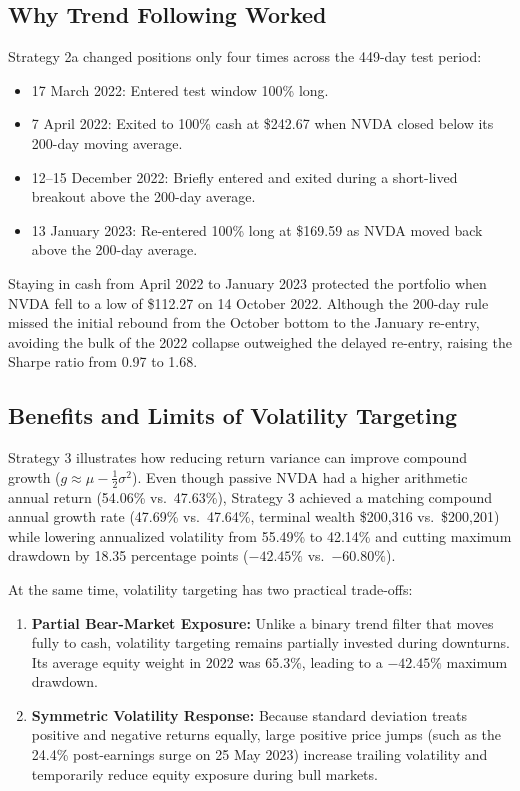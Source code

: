 \documentclass[11pt, a4paper]{article}
\begin{document}
\subsection{Why Trend Following Worked}
Strategy 2a changed positions only four times across the 449-day test period:
\begin{itemize}
    \item 17 March 2022: Entered test window 100\% long.
    \item 7 April 2022: Exited to 100\% cash at \$242.67 when NVDA closed below its 200-day moving average.
    \item 12--15 December 2022: Briefly entered and exited during a short-lived breakout above the 200-day average.
    \item 13 January 2023: Re-entered 100\% long at \$169.59 as NVDA moved back above the 200-day average.
\end{itemize}

Staying in cash from April 2022 to January 2023 protected the portfolio when NVDA fell to a low of \$112.27 on 14 October 2022. Although the 200-day rule missed the initial rebound from the October bottom to the January re-entry, avoiding the bulk of the 2022 collapse outweighed the delayed re-entry, raising the Sharpe ratio from 0.97 to 1.68.

\subsection{Benefits and Limits of Volatility Targeting}
Strategy 3 illustrates how reducing return variance can improve compound growth ($g \approx \mu - \frac{1}{2}\sigma^2$). Even though passive NVDA had a higher arithmetic annual return (54.06\% vs.\ 47.63\%), Strategy 3 achieved a matching compound annual growth rate (47.69\% vs.\ 47.64\%, terminal wealth \$200,316 vs.\ \$200,201) while lowering annualized volatility from 55.49\% to 42.14\% and cutting maximum drawdown by 18.35 percentage points ($-42.45\%$ vs.\ $-60.80\%$).

At the same time, volatility targeting has two practical trade-offs:
\begin{enumerate}
    \item \textbf{Partial Bear-Market Exposure:} Unlike a binary trend filter that moves fully to cash, volatility targeting remains partially invested during downturns. Its average equity weight in 2022 was 65.3\%, leading to a $-42.45\%$ maximum drawdown.
    \item \textbf{Symmetric Volatility Response:} Because standard deviation treats positive and negative returns equally, large positive price jumps (such as the 24.4\% post-earnings surge on 25 May 2023) increase trailing volatility and temporarily reduce equity exposure during bull markets.
\end{enumerate}
\end{document}
